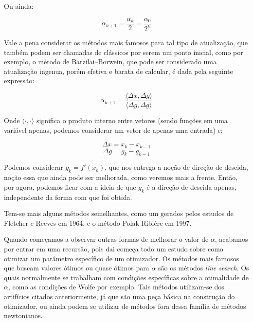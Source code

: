 Ou ainda:

\begin{equation}
    \alpha_{k+1} = \frac{\alpha_{k}}{2} = \frac{\alpha_{0}}{2^k} 
\end{equation}

Vale a pena considerar os métodos mais famosos para tal tipo de atualização,
que também podem ser chamadas de clássicos por serem um ponto inicial, como por
exemplo, o método de Barzilai–Borwein, que pode ser considerado uma atualização
ingenua, porém efetiva e barata de calcular, é dada pela seguinte expressão:

\begin{equation}
    \alpha_{k+1} = \frac{\langle \Delta x, \Delta g \rangle}{\langle \Delta g, \Delta g \rangle}
\end{equation}

Onde \( \langle \cdot, \cdot \rangle \) significa o produto interno entre
vetores (sendo funções em uma variável apenas, podemos considerar um vetor de
apenas uma entrada) e:

\begin{equation}
    \Delta x = x_k - x_{k-1}
\end{equation}
\begin{equation}
    \Delta g = g_k - g_{k-1}
\end{equation}


Podemos considerar \(g_k = f'(x_k) \), que nos entrega a noção de direção de
descida, noção essa que ainda pode ser melhorada, como veremos mais a frente.
Então, por agora, podemos ficar com a ideia de que \(g_k\) é a direção de
descida apenas, independente da forma com que foi obtida.

Tem-se mais alguns métodos semelhantes, como um gerados pelos estudos de
Fletcher e Reeves em 1964, e o método Polak-Ribière em 1997.

Quando começamos a observar outras formas de melhorar o valor de \(\alpha\),
acabamos por entrar em uma recursão, pois dai começa todo um estudo sobre como
otimizar um parâmetro específico de um otimizador. Os métodos mais famosos que
buscam valores ótimos ou quase ótimos para \(\alpha\) são os métodos
\textit{line search}. Os quais normalmente se trabalham com condições específicas
sobre a otimalidade de \(\alpha\), como as condições de Wolfe por exemplo. Tais
métodos utilizam-se dos artifícios citados anteriormente, já que são uma peça
básica na construção do otimizador, ou ainda podem se utilizar de métodos fora
dessa família de métodos newtonianos.

